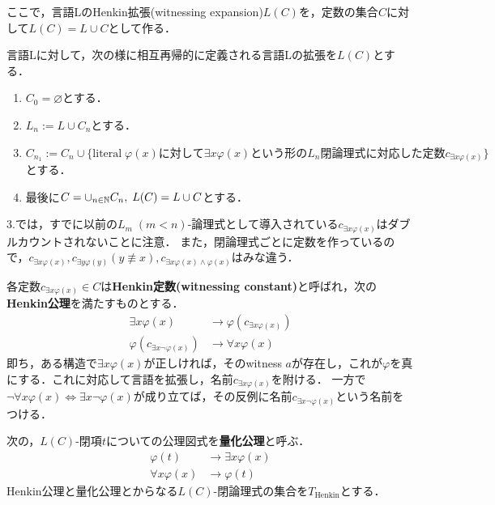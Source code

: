 \documentclass[uplatex, 12pt, dvipdfmx]{jsreport}
\begin{document}
ここで，言語LのHenkin拡張(witnessing expansion)$L(C)$を，定数の集合$C$に対して$L(C)=L\cup C$として作る．
\begin{definition}
    言語Lに対して，次の様に相互再帰的に定義される言語Lの拡張を$L(C)$とする．
    \begin{enumerate}
        \item $C_0=\varnothing$とする．
        \item $L_n:=L\cup C_n$とする．
        \item $C_{n_1}:=C_n\cup\{\mathrm{literal}\;\varphi(x)に対して\exists x\varphi(x)という形のL_n閉論理式に対応した定数c_{\exists x\varphi(x)}\}$とする．
        \item 最後に$C=\cup_{n\in\mathbb{N}}C_n,\;L(C)=L\cup C$とする．
    \end{enumerate}
    3.では，すでに以前の$L_m\;(m<n)$-論理式として導入されている$c_{\exists x\varphi(x)}$はダブルカウントされないことに注意．
    また，閉論理式ごとに定数を作っているので，$c_{\exists x\varphi(x)},c_{\exists y\varphi(y)}(y\not\equiv x),c_{\exists x\varphi(x) \land \varphi(x)}$はみな違う．
\end{definition}
\begin{definition}
    各定数$c_{\exists x\varphi(x)}\in C$は\textbf{Henkin定数(witnessing constant)}と呼ばれ，次の\textbf{Henkin公理}を満たすものとする．
    \begin{align*}
        \exists x\varphi(x)&\to \varphi(c_{\exists x\varphi(x)})\\
        \varphi(c_{\exists x\lnot\varphi(x)})&\to \forall x\varphi(x)
    \end{align*}
    即ち，ある構造で$\exists x\varphi(x)$が正しければ，そのwitness $a$が存在し，これが$\varphi$を真にする．これに対応して言語を拡張し，名前$c_{\exists x\varphi(x)}$を附ける．
    一方で$\lnot\forall x\varphi(x)\Leftrightarrow\exists x\lnot\varphi(x)$が成り立てば，その反例に名前$c_{\exists x\lnot\varphi(x)}$という名前をつける．
\end{definition}
\begin{definition}\label{axiom-quantifier}
    次の，$L(C)$-閉項$t$についての公理図式を\textbf{量化公理}と呼ぶ．
    \begin{align*}
        \varphi(t)&\to\exists x\varphi(x)\\
        \forall x\varphi(x)&\to\varphi(t)
    \end{align*}
    Henkin公理と量化公理とからなる$L(C)$-閉論理式の集合を$T_\mathrm{Henkin}$とする．
\end{definition}
\end{document}
